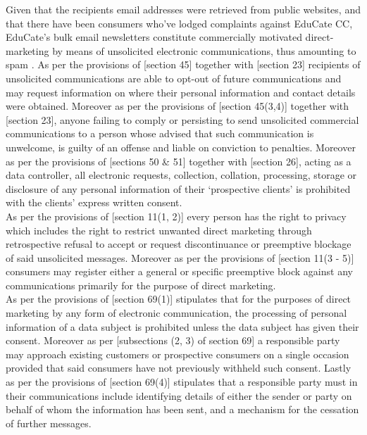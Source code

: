 \documentclass[11pt]{article}
\begin{document}
Given that the recipients email addresses were retrieved from public websites,
and that there have been consumers who've lodged complaints against EduCate CC,
EduCate's bulk email newsletters constitute commercially motivated
direct-marketing by means of unsolicited electronic communications, thus
amounting to spam
\cite{hermann14_direct_marketing_vs_spam,tladi08_reg_unsol_comm}. As per the
provisions of [section 45]\cite{rsa02_elect_comm_trans_act} together with [section
23]\cite{rsa12_elect_comm_trans_amend_bill} recipients of unsolicited
communications are able to opt-out of future communications and may request
information on where their personal information and contact details were
obtained. Moreover as per the provisions of [section
45(3,4)]\cite{rsa02_elect_comm_trans_act} together with [section
23]\cite{rsa12_elect_comm_trans_amend_bill}, anyone failing to comply or
persisting to send unsolicited commercial communications to a person whose
advised that such communication is unwelcome, is guilty of an offense and liable
on conviction to penalties. Moreover as per the provisions of [sections 50 \&
51]\cite{rsa02_elect_comm_trans_act} together with [section
26]\cite{rsa12_elect_comm_trans_amend_bill}, acting as a data controller, all
electronic requests, collection, collation, processing, storage or disclosure of
any personal information of their `prospective clients' is prohibited with the
clients' express written consent.\\

As per the provisions of [section 11(1, 2)]\cite{rsa08_cpa} every
person has the right to privacy which includes the right to restrict unwanted
direct marketing through retrospective refusal to accept or request
discontinuance or preemptive blockage of said unsolicited messages. Moreover as
per the provisions of [section 11(3 - 5)]\cite{rsa08_cpa}
consumers may register either a general or specific preemptive block against any
communications primarily for the purpose of direct marketing.\\

As per the provisions of [section 69(1)]\cite{rsa13_popi} stipulates that for the
purposes of direct marketing by any form of electronic communication, the
processing of personal information of a data subject is prohibited unless the
data subject has given their consent. Moreover as per [subsections (2, 3) of
section 69]\cite{rsa13_popi} a responsible party may approach existing customers
or prospective consumers on a single occasion provided that said consumers have
not previously withheld such consent. Lastly as per the provisions of [section
69(4)]\cite{rsa13_popi} stipulates that a responsible party must in their
communications include identifying details of either the sender or party on
behalf of whom the information has been sent, and a mechanism for the cessation
of further messages.
\end{document}
